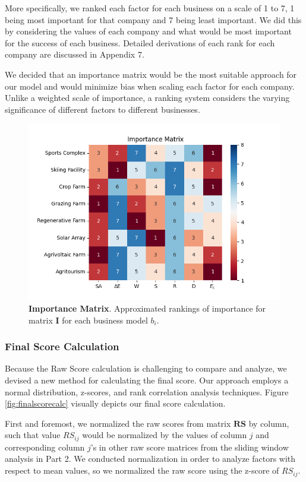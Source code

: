 \documentclass{mcmthesis}
\begin{document}
More specifically, we ranked each factor for each business on a scale of 1 to 7, 1 being most important for that company and 7 being least important. We did this by considering the values of each company and what would be most important for the success of each business. Detailed derivations of each rank for each company are discussed in Appendix 7.

We decided that an importance matrix would be the most suitable approach for our model and would minimize bias when scaling each factor for each company. Unlike a weighted scale of importance, a ranking system considers the varying significance of different factors to different businesses.

\begin{figure}[!htbp]
\centering
    \includegraphics[scale=0.6]{figures/correlationmatrix.png}
    \captionsetup{width=0.9\textwidth}
    \caption{\textbf{Importance Matrix}. Approximated rankings of importance for matrix \textbf{I} for each business model $b_i$. }
    \label{fig:importancematrix}
\end{figure}

\subsubsection{Final Score Calculation}
Because the Raw Score calculation is challenging to compare and analyze, we devised a new method for calculating the final score. Our approach employs a normal distribution, z-scores, and rank correlation analysis techniques. Figure \ref{fig:finalscorecalc} visually depicts our final score calculation.

First and foremost, we normalized the raw scores from matrix $\textbf{RS}$ by column, such that value $RS_{ij}$ would be normalized by the values of column $j$ and corresponding column $j$'s in other raw score matrices from the sliding window analysis in Part 2. We conducted normalization in order to analyze factors with respect to mean values, so we normalized the raw score using the z-score of $RS_{ij}$. 
\end{document}
